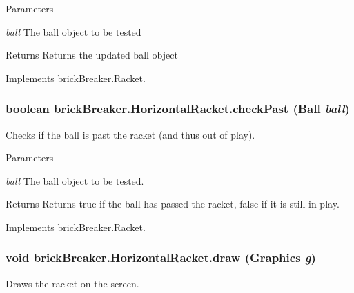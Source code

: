 \begin{DoxyParams}{Parameters}
\item[{\em ball}]The ball object to be tested \end{DoxyParams}
\begin{DoxyReturn}{Returns}
Returns the updated ball object 
\end{DoxyReturn}


Implements \hyperlink{classbrick_breaker_1_1_racket_a81880bdbdfda6ec88d1d4e7fc72f8f74}{brickBreaker.Racket}.

\hypertarget{classbrick_breaker_1_1_horizontal_racket_a183d1d47f35fad74e603534ec74fbdb9}{
\subsubsection[{checkPast}]{\setlength{\rightskip}{0pt plus 5cm}boolean brickBreaker.HorizontalRacket.checkPast ({\bf Ball} {\em ball})}}
\label{classbrick_breaker_1_1_horizontal_racket_a183d1d47f35fad74e603534ec74fbdb9}
Checks if the ball is past the racket (and thus out of play).


\begin{DoxyParams}{Parameters}
\item[{\em ball}]The ball object to be tested. \end{DoxyParams}
\begin{DoxyReturn}{Returns}
Returns true if the ball has passed the racket, false if it is still in play. 
\end{DoxyReturn}


Implements \hyperlink{classbrick_breaker_1_1_racket_a129dbc802cd26299ebca916283edbe27}{brickBreaker.Racket}.

\hypertarget{classbrick_breaker_1_1_horizontal_racket_a8d97c411da71162acd5ecbb32c333f8d}{
\subsubsection[{draw}]{\setlength{\rightskip}{0pt plus 5cm}void brickBreaker.HorizontalRacket.draw (Graphics {\em g})}}
\label{classbrick_breaker_1_1_horizontal_racket_a8d97c411da71162acd5ecbb32c333f8d}
Draws the racket on the screen.


